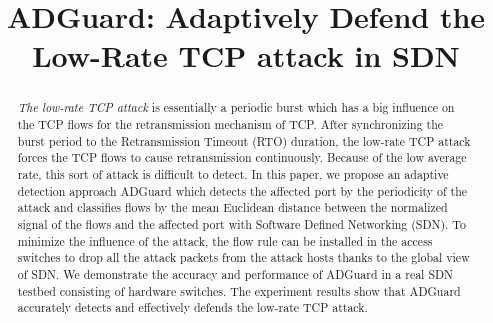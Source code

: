 \documentclass[conference]{IEEEtran}
\newcommand{\TheName}{ADGuard}
\begin{document}
\title{\TheName{}: Adaptively Defend the Low-Rate TCP attack in SDN
}

\author{

}

\maketitle

\begin{abstract}
\emph{The low-rate TCP attack} \cite{b20} is essentially a periodic burst which has a big influence on the TCP flows for the retransmission mechanism of TCP. After synchronizing the burst period to the Retransmission Timeout (RTO) duration, the low-rate TCP attack forces the TCP flows to cause retransmission continuously. Because of the low average rate, this sort of attack is difficult to detect. In this paper, we propose an adaptive detection approach \TheName{} which detects the affected port by the periodicity of the attack and classifies flows by the mean Euclidean distance between the normalized signal of the flows and the affected port with Software Defined Networking (SDN). To minimize the influence of the attack, the flow rule can be installed in the access switches to drop all the attack packets from the attack hosts thanks to the global view of SDN. We demonstrate the accuracy and performance of \TheName{} in a real SDN testbed consisting of hardware switches. The experiment results show that \TheName{} accurately detects and effectively defends the low-rate TCP attack.
\end{abstract}

\end{document}
